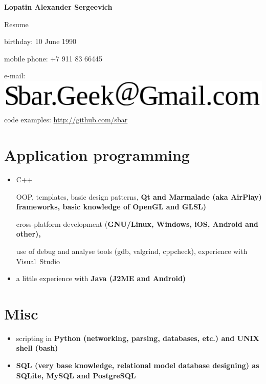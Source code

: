 \begin{center}
\fontsize{16pt}{14pt}\selectfont
\bfseries Lopatin Alexander Sergeevich\mdseries

\fontsize{14pt}{14pt}\selectfont
Resume
\end{center}

{
\fontsize{12pt}{12pt}\selectfont
\begin{flushright}
\item birthday: 10 June 1990
\item mobile phone: +7 911 83 66445
\item e-mail: \includegraphics[scale=0.2]{email}
\item code examples: \url{http://github.com/sbar}
\end{flushright}
}

\section{Application programming}
\begin{itemize}
\item C++

\subitem OOP, templates, basic design patterns,
\bfseries Qt \mdseries and
\bfseries Marmalade \mdseries (aka \bfseries AirPlay\mdseries) frameworks,
basic knowledge of \bfseries OpenGL \mdseries and \bfseries GLSL\mdseries)

\subitem cross-platform development
(\bfseries GNU/Linux\mdseries, Windows, iOS,
\bfseries Android \mdseries and other),

\subitem use of debug and analyse tools (gdb, valgrind, cppcheck),
experience with Visual~Studio

\item a little experience with \bfseries Java \mdseries (J2ME and Android)
\end{itemize}

\section{Misc}
\begin{itemize}
\item scripting in \bfseries Python \mdseries
(networking, parsing, databases, etc.) and
\bfseries UNIX shell (bash)\mdseries
\item \bfseries SQL \mdseries
(very base knowledge, relational model database designing)
as SQLite, MySQL and PostgreSQL
\end{itemize}


